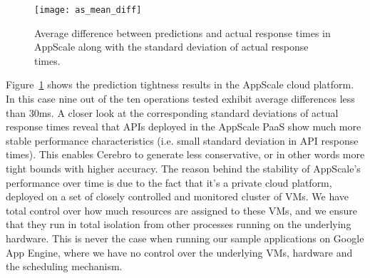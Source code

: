 \begin{figure}
\centering
\texttt{[image: as\_mean\_diff]}
\caption{Average difference between predictions and actual response times in AppScale along with the standard deviation of actual response times.}
\label{fig:as_mean_diff}
\end{figure}

Figure~\ref{fig:as_mean_diff} shows the prediction tightness results in the AppScale cloud platform. In this case nine out of the ten operations tested
exhibit average differences less than 30ms. A closer look at the corresponding standard deviations of actual response times reveal that APIs deployed 
in the AppScale PaaS show much more stable performance characteristics (i.e. small standard deviation in API response times). This enables Cerebro
to generate less conservative, or in other words more tight bounds with higher accuracy. The reason behind the stability of AppScale's performance
over time is due to the fact that it's a private cloud platform, deployed on a set of closely controlled and monitored cluster of VMs. We have total control
over how much resources are assigned to these VMs, and we ensure that they run in total isolation from other processes running on the underlying hardware.
This is never the case when running our sample applications on Google App Engine, where we have no control over the underlying VMs, hardware and the
scheduling mechanism.